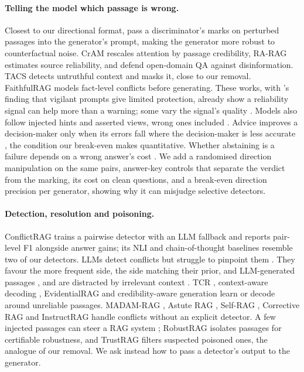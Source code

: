 \paragraph{Telling the model which passage is wrong.}
Closest to our directional format, \citet{hong2024gullible} pass a discriminator's marks on perturbed passages into the
generator's prompt, making the generator more robust to counterfactual noise. CrAM \citep{deng2025cram} rescales
attention by passage credibility, RA-RAG \citep{hwang2025rarag} estimates source reliability, and
\citet{weller2024defending} defend open-domain QA against disinformation. TACS \citep{yu2024tacs} detects untruthful context and masks it,
close to our removal. FaithfulRAG \citep{zhang2025faithfulrag} models
fact-level conflicts before generating. These works, with \citet{pan2023risk}'s finding that vigilant
prompts give limited protection, already show a reliability signal can help more than a warning; some vary
the signal's quality \citep{hong2024gullible,pan2024credibility}. Models also follow injected hints and asserted views, wrong
ones included \citep{turpin2023unfaithful,sharma2024sycophancy}. Advice improves a decision-maker only when its
errors fall where the decision-maker is less accurate \citep{bansal2021accurate,mozannar2020defer}, the
condition our break-even makes quantitative. Whether
abstaining is a failure depends on a wrong answer's cost \citep{wen2025abstention,song2025trustscore}.
We add a randomised direction manipulation on the same pairs, answer-key controls that separate the verdict
from the marking, its cost on clean questions, and a break-even direction precision per generator,
showing why it can misjudge selective detectors.

\paragraph{Detection, resolution and poisoning.}
ConflictRAG \citep{wang2026conflictrag} trains a pairwise detector with an LLM fallback and reports pair-level F1
alongside answer gains; its NLI and chain-of-thought baselines resemble two of our detectors. LLMs detect conflicts but struggle to pinpoint them
\citep{gokul2025contradiction,wang2024resolving,jiayang2024econ}. They favour the more frequent side, the side matching
their prior, and LLM-generated passages \citep{jin2024tugofwar,kortukov2024realistic,tan2024blinded}, and are
distracted by irrelevant context \citep{shi2023distracted,schuster2026whose}. TCR \citep{ye2026tcr}, context-aware
decoding \citep{shi2024cad}, EvidentialRAG \citep{hossain2026evidentialrag} and credibility-aware generation
\citep{pan2024credibility} learn or decode around unreliable passages. MADAM-RAG \citep{wang2025madam}, Astute RAG
\citep{wang2025astute}, Self-RAG \citep{asai2024selfrag}, Corrective RAG \citep{yan2024crag} and InstructRAG
\citep{wei2025instructrag} handle conflicts without an explicit detector. A few injected passages can steer a RAG
system \citep{zou2025poisonedrag}; RobustRAG \citep{xiang2024robustrag} isolates passages for certifiable robustness,
and TrustRAG \citep{zhou2025trustrag} filters suspected poisoned ones, the analogue of our removal. We ask instead how
to pass a detector's output to the generator.
